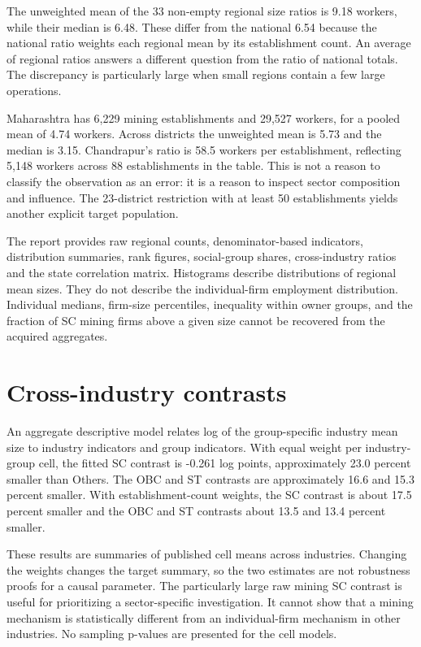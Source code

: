 \documentclass[11pt,a4paper]{report}
\begin{document}
The unweighted mean of the 33 non-empty regional size ratios is 9.18 workers, while their median is 6.48. These differ from the national 6.54 because the national ratio weights each regional mean by its establishment count. An average of regional ratios answers a different question from the ratio of national totals. The discrepancy is particularly large when small regions contain a few large operations.

Maharashtra has 6,229 mining establishments and 29,527 workers, for a pooled mean of 4.74 workers. Across districts the unweighted mean is 5.73 and the median is 3.15. Chandrapur's ratio is 58.5 workers per establishment, reflecting 5,148 workers across 88 establishments in the table. This is not a reason to classify the observation as an error: it is a reason to inspect sector composition and influence. The 23-district restriction with at least 50 establishments yields another explicit target population.

The report provides raw regional counts, denominator-based indicators, distribution summaries, rank figures, social-group shares, cross-industry ratios and the state correlation matrix. Histograms describe distributions of regional mean sizes. They do not describe the individual-firm employment distribution. Individual medians, firm-size percentiles, inequality within owner groups, and the fraction of SC mining firms above a given size cannot be recovered from the acquired aggregates.

\section{Cross-industry contrasts}
An aggregate descriptive model relates log of the group-specific industry mean size to industry indicators and group indicators. With equal weight per industry-group cell, the fitted SC contrast is -0.261 log points, approximately 23.0 percent smaller than Others. The OBC and ST contrasts are approximately 16.6 and 15.3 percent smaller. With establishment-count weights, the SC contrast is about 17.5 percent smaller and the OBC and ST contrasts about 13.5 and 13.4 percent smaller.

These results are summaries of published cell means across industries. Changing the weights changes the target summary, so the two estimates are not robustness proofs for a causal parameter. The particularly large raw mining SC contrast is useful for prioritizing a sector-specific investigation. It cannot show that a mining mechanism is statistically different from an individual-firm mechanism in other industries. No sampling p-values are presented for the cell models.
\end{document}
